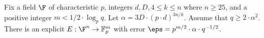 \begin{theorem}\label{thm-ext_main_intro}
Fix a field $\F$ of characteristic $p$, integers $d,D,4\leq k\leq n$ where $n\geq 25$,
and a positive integer $m<1/2\cdot \log_p q$.
Let $\alpha=3 D \cdot (p\cdot d)^{3 n/k} $. Assume that   $q\geq 2\cdot  \alpha^2$.
There is an explicit   $E:\F^n\to \mathbb{F}_p^m$ with error
$\eps =  p^{m/2}\cdot \alpha \cdot q^{-1/2}$.
\end{theorem}
